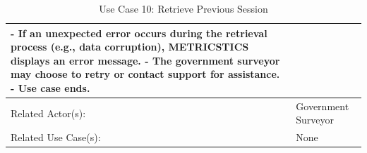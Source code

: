 \begin{table}[h]
\begin{tabular}{ | p{4cm} | p{10cm} | }
{   - If an unexpected error occurs during the retrieval process (e.g., data corruption), METRICSTICS displays an error message. \newline
   - The government surveyor may choose to retry or contact support for assistance. \newline
   - Use case ends.}\\
 \hline
 Related Actor(s): & Government Surveyor\\
 \hline
 Related Use Case(s): & None\\
 \hline
 \end{tabular}
\renewcommand{\thetable}{\arabic{table}}
\caption{Use Case 10: Retrieve Previous Session}
\label{tab:table1}
\end{table}


\begin{table}[h]

\end{table}
